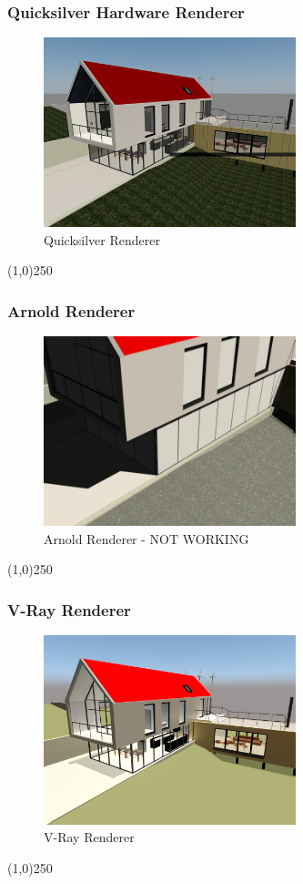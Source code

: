 \begin{frame}
\frametitle{Quicksilver Hardware Renderer}
\begin{figure}
	\centering
	\includegraphics[height=5.5cm]{img/Rendering/QuickSilver.jpg}
	\caption{Quicksilver Renderer}
	\label{fig:QuickSilver}
\end{figure}
\end{frame}
\begin{center}\line(1,0){250}\end{center}


\begin{frame}
\frametitle{Arnold Renderer}
\begin{figure}
	\centering
	\includegraphics[height=5.5cm]{img/RenderEngine/Revit3DSScanLine.jpg}
	\caption{Arnold Renderer - NOT WORKING}
	\label{fig:ArnoldRenderer}
\end{figure}
\end{frame}
\begin{center}\line(1,0){250}\end{center}

\begin{frame}
\frametitle{V-Ray Renderer}
\begin{figure}
	\centering
	\includegraphics[height=5.5cm]{img/Rendering/VRay.jpg}
	\caption{V-Ray Renderer}
	\label{fig:V-RayRenderer}
\end{figure}
\end{frame}
\begin{center}\line(1,0){250}\end{center}




